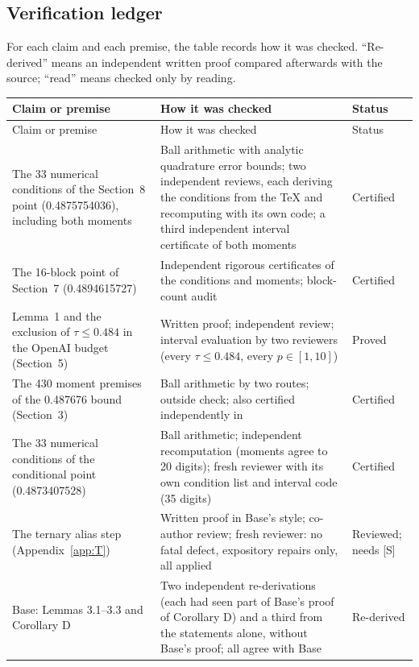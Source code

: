 \documentclass[11pt]{article}
\theoremstyle{plain}
\begin{document}
\subsection*{Verification ledger}
For each claim and each premise, the table records how it was checked. ``Re-derived'' means an independent written proof compared afterwards with the source; ``read'' means checked only by reading.

{\small
\begin{longtable}{@{}>{\raggedright\arraybackslash}p{4.2cm}>{\raggedright\arraybackslash}p{8.7cm}>{\raggedright\arraybackslash}p{2.6cm}@{}}
\toprule
Claim or premise & How it was checked & Status \\
\midrule
\endfirsthead
\toprule
Claim or premise & How it was checked & Status \\
\midrule
\endhead
\bottomrule
\endlastfoot
The 33 numerical conditions of the Section~8 point (0.4875754036), including both moments & Ball arithmetic with analytic quadrature error bounds; two independent reviews, each deriving the conditions from the \TeX{} and recomputing with its own code; a third independent interval certificate of both moments & Certified \\
The 16-block point of Section~7 (0.4894615727) & Independent rigorous certificates of the conditions and moments; block-count audit & Certified \\
Lemma~1 and the exclusion of $\tau \le 0.484$ in the OpenAI budget (Section~5) & Written proof; independent review; interval evaluation by two reviewers (every $\tau \le 0.484$, every $p \in [1,10]$) & Proved \\
The 430 moment premises of the 0.487676 bound (Section~3) & Ball arithmetic by two routes; outside check; also certified independently in~\cite{bills} & Certified \\
The 33 numerical conditions of the conditional point (0.4873407528) & Ball arithmetic; independent recomputation (moments agree to 20 digits); fresh reviewer with its own condition list and interval code (35 digits) & Certified \\
The ternary alias step (Appendix~\ref{app:T}) & Written proof in Base's style; co-author review; fresh reviewer: no fatal defect, expository repairs only, all applied & Reviewed; needs [S] \\
Base: Lemmas 3.1--3.3 and Corollary D & Two independent re-derivations (each had seen part of Base's proof of Corollary D) and a third from the statements alone, without Base's proof; all agree with Base & Re-derived \\

\end{longtable}}
\end{document}
